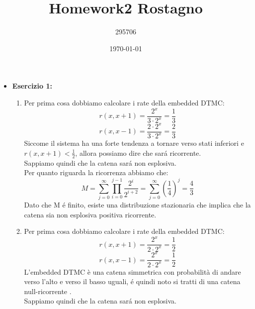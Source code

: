 \documentclass[a4paper,12pt]{article}
\begin{document}
	\title{\textbf{Homework2 Rostagno}}
	\author{295706}
	\date{\today}
	\maketitle
	
	\begin{itemize}
		\item \textbf{Esercizio 1: }
		\begin{enumerate}[label=\alph*)]
			\item Per prima cosa dobbiamo calcolare i rate della embedded DTMC:\\
			\[
			r(x,x+1)=\frac{2^x}{3 \cdot 2^x}=\frac{1}{3}
			\]
			\[
			r(x,x-1)=\frac{2 \cdot2^x}{3 \cdot 2^x}=\frac{2}{3}
			\]
			Siccome il sistema ha una forte tendenza a tornare verso stati inferiori e $r(x,x+1) <\frac{1}{2}$, allora possiamo dire che sará ricorrente.\\
			Sappiamo quindi che la catena sará non esplosiva.\\
			Per quanto riguarda la ricorrenza abbiamo che:
			\[
			M=\sum_{j=0}^{\infty}\prod_{i=0}^{j-1}\frac{2^i}{2^{i+2}}=\sum_{j=0}^{\infty}(\frac{1}{4})^j=\frac{4}{3}
			\]
			Dato che M é finito, esiste una distribuzione stazionaria che implica che la catena sia non esplosiva positiva ricorrente.
			\item Per prima cosa dobbiamo calcolare i rate della embedded DTMC:\\
			\[
			r(x,x+1)=\frac{2^x}{2 \cdot 2^x}=\frac{1}{2}
			\]
			\[
			r(x,x-1)=\frac{2^x}{2 \cdot 2^x}=\frac{1}{2}
			\]
			L'embedded DTMC è una catena simmetrica con probabilità di andare verso l'alto e verso il basso uguali, é quindi noto si tratti di una catena null-ricorrente .\\
			Sappiamo quindi che la catena sará non esplosiva.\\
		

\end{enumerate}
\end{itemize}
\end{document}
